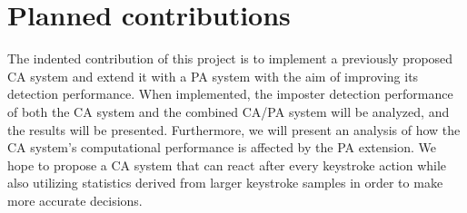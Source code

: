 \documentclass[informationsecurity]{gucmasterproject}
\begin{document}
%

\section{Planned contributions}
The indented contribution of this project is to implement a previously proposed CA system \cite{mondal} and extend it with a PA system with the aim of improving its detection performance.
When implemented, the imposter detection performance of both the CA system and the combined CA/PA system will be analyzed, and the results will be presented.
Furthermore, we will present an analysis of how the CA system's computational performance is affected by the PA extension. 
We hope to propose a CA system that can react after every keystroke action while also utilizing statistics derived from larger keystroke samples in order to make more accurate decisions.

\end{document}
